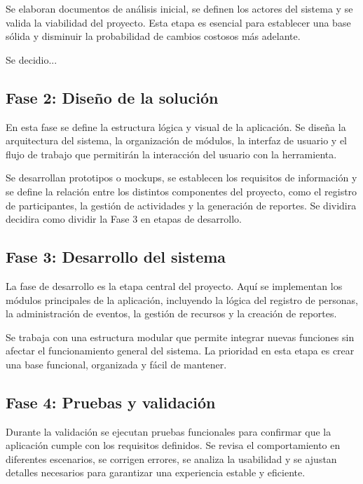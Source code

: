 \documentclass[11pt,a4paper]{article}
\begin{document}
	Se elaboran documentos de análisis inicial, se definen los actores del sistema y se valida la viabilidad del proyecto. Esta etapa es esencial para establecer una base sólida y disminuir la probabilidad de cambios costosos más adelante.\par
	
	Se decidio...
	
	\subsection{Fase 2: Diseño de la solución}
	En esta fase se define la estructura lógica y visual de la aplicación. Se diseña la arquitectura del sistema, la organización de módulos, la interfaz de usuario y el flujo de trabajo que permitirán la interacción del usuario con la herramienta.\par
	
	Se desarrollan prototipos o mockups, se establecen los requisitos de información y se define la relación entre los distintos componentes del proyecto, como el registro de participantes, la gestión de actividades y la generación de reportes. Se dividira decidira como dividir la Fase 3 en etapas de desarrollo.
	
	\subsection{Fase 3: Desarrollo del sistema}
	La fase de desarrollo es la etapa central del proyecto. Aquí se implementan los módulos principales de la aplicación, incluyendo la lógica del registro de personas, la administración de eventos, la gestión de recursos y la creación de reportes.\par
	
	Se trabaja con una estructura modular que permite integrar nuevas funciones sin afectar el funcionamiento general del sistema. La prioridad en esta etapa es crear una base funcional, organizada y fácil de mantener.
	
	\subsection{Fase 4: Pruebas y validación}
	Durante la validación se ejecutan pruebas funcionales para confirmar que la aplicación cumple con los requisitos definidos. Se revisa el comportamiento en diferentes escenarios, se corrigen errores, se analiza la usabilidad y se ajustan detalles necesarios para garantizar una experiencia estable y eficiente.\par
	
\end{document}
